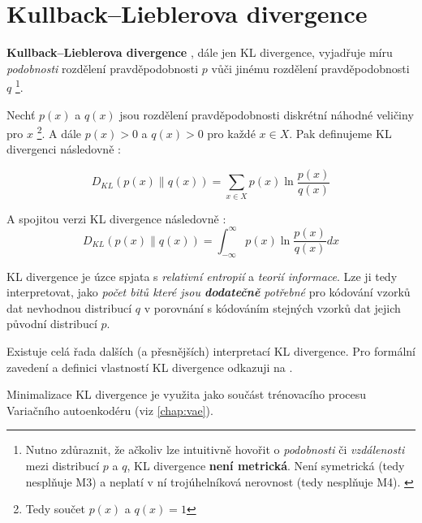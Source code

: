 \section{Kullback–Lieblerova divergence}
\label{sec:kl_divergence}

\textbf{Kullback–Lieblerova divergence} \cite{Kullback1951}, dále jen KL divergence, vyjadřuje míru \emph{podobnosti} rozdělení pravděpodobnosti $p$ vůči jinému rozdělení pravděpodobnosti $q$
\footnote{Nutno zdůraznit, že ačkoliv lze intuitivně hovořit o \emph{podobnosti} či \emph{vzdálenosti} mezi distribucí $p$ a $q$, KL divergence \textbf{není metrická}. Není symetrická (tedy nesplňuje M3) a neplatí v ní trojúhelníková nerovnost (tedy nesplňuje M4). \cite{Phillips2021}}.


Nechť $p(x)$ a $q(x)$ jsou rozdělení pravděpodobnosti diskrétní náhodné veličiny pro $x$
\footnote{Tedy součet $p(x)$ a $q(x) = 1$}.
A dále $p(x) > 0$ a $q(x) > 0$ pro každé $x \in X$. Pak definujeme KL divergenci následovně \cite{Murphy2022}:

\begin{equation}
    D_{KL}(p(x) \| q(x)) = \sum_{x \in X}^{}p(x)\ln{\frac{p(x)}{q(x)}}
\end{equation}

A spojitou verzi KL divergence následovně \cite{Murphy2022}:
\begin{equation}
    D_{KL}(p(x) \| q(x)) = \int_{-\infty}^{\infty}p(x)\ln{\frac{p(x)}{q(x)}}dx 
\end{equation}

KL divergence je úzce spjata s \emph{relativní entropií} a \emph{teorií informace}.
Lze ji tedy interpretovat, jako \emph{počet bitů které jsou \textbf{dodatečně} potřebné} pro kódování vzorků dat nevhodnou distribucí $q$ v porovnání s kódováním stejných vzorků dat jejich původní distribucí $p$.

Existuje celá řada dalších (a přesnějších) interpretací KL divergence. Pro formální zavedení a definici vlastností KL divergence odkazuji na \cite[kap. 5.1]{Murphy2023}.

Minimalizace KL divergence je využita jako součást trénovacího procesu Variačního autoenkodéru (viz \autoref{chap:vae}).

